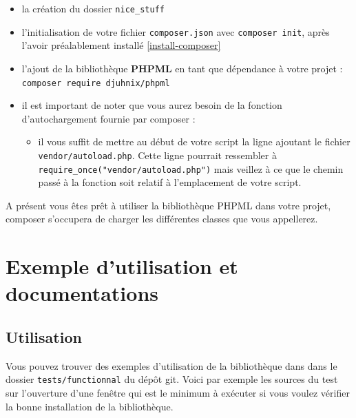 \documentclass[11pt,a4paper,krantz2,11pt,oneside]{krantz}
\providecommand{\tightlist}{%
  \setlength{\itemsep}{0pt}\setlength{\parskip}{0pt}}
\begin{document}
\begin{itemize}
\tightlist
\item
  la création du dossier \texttt{nice\_stuff}
\item
  l'initialisation de votre fichier \texttt{composer.json} avec \texttt{composer\ init}, après l'avoir préalablement installé \ref{install-composer}
\item
  l'ajout de la bibliothèque \textbf{PHPML} en tant que dépendance à votre projet : \texttt{composer\ require\ djuhnix/phpml}
\item
  il est important de noter que vous aurez besoin de la fonction d'autochargement fournie par composer :

  \begin{itemize}
  \tightlist
  \item
    il vous suffit de mettre au début de votre script la ligne ajoutant le fichier \texttt{vendor/autoload.php}. Cette ligne pourrait ressembler à \texttt{require\_once("vendor/autoload.php")} mais veillez à ce que le chemin passé à la fonction soit relatif à l'emplacement de votre script.
  \end{itemize}
\end{itemize}

A présent vous êtes prêt à utiliser la bibliothèque PHPML dans votre projet, composer s'occupera de charger les différentes classes que vous appellerez.

\hypertarget{exemple-dutilisation-et-documentations}{%
\section{Exemple d'utilisation et documentations}\label{exemple-dutilisation-et-documentations}}

\hypertarget{utilisation}{%
\subsection{Utilisation}\label{utilisation}}

Vous pouvez trouver des exemples d'utilisation de la bibliothèque dans dans le dossier \texttt{tests/functionnal} du dépôt git. Voici par exemple les sources du test sur l'ouverture d'une fenêtre qui est le minimum à exécuter si vous voulez vérifier la bonne installation de la bibliothèque.
\end{document}
